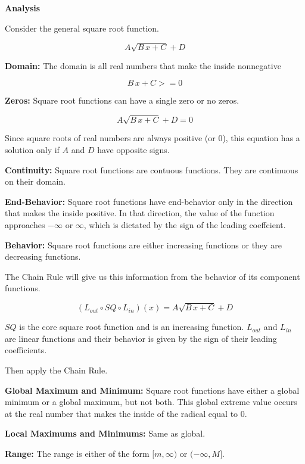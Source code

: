 \documentclass{ximera}
\begin{document}
\begin{summary} \textbf{\textcolor{red!70!yellow}{Analysis}}


Consider the general square root function.

\[  A \sqrt{B \,x + C} + D  \]


\textbf{Domain:} The domain is all real numbers that make the inside nonnegative


\[ B \,x + C >= 0 \]


\textbf{Zeros:} Square root functions can have a single zero or no zeros.


\[  A \sqrt{B \,x + C} + D  = 0 \]

Since square roots of real numbers are always positive (or $0$), this equation has a solution only if $A$ and $D$ have opposite signs.


\textbf{Continuity:} Square root functions are contuous functions.  They are continuous on their domain.



\textbf{End-Behavior:} Square root functions have end-behavior only in the direction that makes the inside positive. In that direction, the value of the function approaches $-\infty$ or $\infty$, which is dictated by the sign of the leading coeffcient.



\textbf{Behavior:} Square root functions are either increasing functions or they are decreasing functions.  

The Chain Rule will give us this information from the behavior of its component functions.


\[
(L_{out} \circ SQ \circ L_{in})(x) = A \sqrt{B \,x + C} + D
\]


$SQ$ is the core square root function and is an increasing function.  $L_{out}$ and $L_{in}$ are linear functions and their behavior is given by the sign of their leading coefficients.

Then apply the Chain Rule.



\textbf{Global Maximum and Minimum:}  Square root functions have either a global minimum or a global maximum, but not both. This global extreme value occurs at the real number that makes the inside of the radical equal to $0$.


\textbf{Local Maximums and Minimums:} Same as global.


\textbf{Range:} The range is either of the form $[m, \infty)$ or $(-\infty, M]$.

\end{summary}
\end{document}
